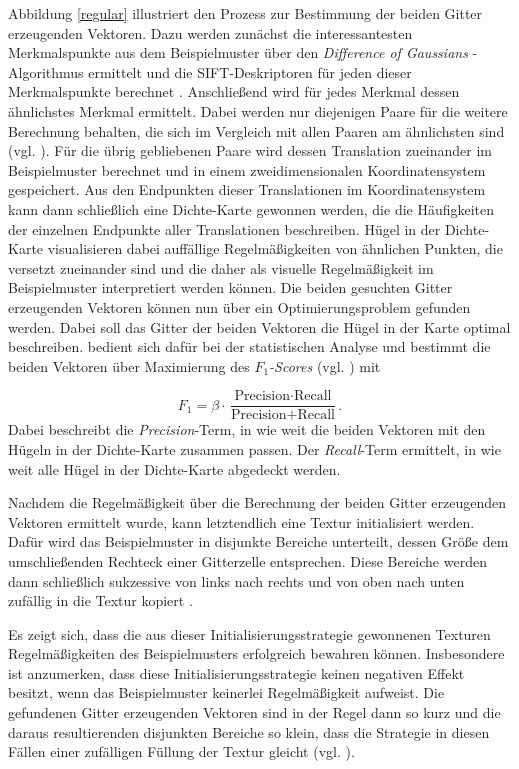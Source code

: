 Abbildung \ref{regular} illustriert den Prozess zur Bestimmung der beiden Gitter erzeugenden Vektoren.
Dazu werden zunächst die interessantesten Merkmalspunkte aus dem Beispielmuster über den \emph{\glqq Difference of Gaussians\grqq} -Algorithmus ermittelt und die SIFT-Deskriptoren für jeden dieser Merkmalspunkte berechnet \cite{SelfTuning}.
Anschließend wird für jedes Merkmal dessen ähnlichstes Merkmal ermittelt.
Dabei werden nur diejenigen Paare für die weitere Berechnung behalten, die sich im Vergleich mit allen Paaren am ähnlichsten sind (vgl. \cite{SelfTuning}).
Für die übrig gebliebenen Paare wird dessen Translation zueinander im Beispielmuster berechnet und in einem zweidimensionalen Koordinatensystem gespeichert.
Aus den Endpunkten dieser Translationen im Koordinatensystem kann dann schließlich eine Dichte-Karte gewonnen werden, die die Häufigkeiten der einzelnen Endpunkte aller Translationen beschreiben.
Hügel in der Dichte-Karte visualisieren dabei auffällige Regelmäßigkeiten von ähnlichen Punkten, die versetzt zueinander sind und die daher als visuelle Regelmäßigkeit im Beispielmuster interpretiert werden können.
Die beiden gesuchten Gitter erzeugenden Vektoren können nun über ein Optimierungsproblem gefunden werden.
Dabei soll das Gitter der beiden Vektoren die Hügel in der Karte optimal beschreiben.
\cite{SelfTuning} bedient sich dafür bei der statistischen Analyse und bestimmt die beiden Vektoren über Maximierung des \emph{\glqq $F_1$-Scores\grqq} (vgl. \cite{F1Score, SelfTuning}) mit

\begin{equation*}
	F_1 = \beta \cdot \frac{\text{Precision} \cdot \text{Recall}}{\text{Precision} + \text{Recall}}\text{.}
\end{equation*}
Dabei beschreibt die \emph{Precision}-Term, in wie weit die beiden Vektoren mit den Hügeln in der Dichte-Karte zusammen passen.
Der \emph{Recall}-Term ermittelt, in wie weit alle Hügel in der Dichte-Karte abgedeckt werden.

Nachdem die Regelmäßigkeit über die Berechnung der beiden Gitter erzeugenden Vektoren ermittelt wurde, kann letztendlich eine Textur initialisiert werden.
Dafür wird das Beispielmuster in disjunkte Bereiche unterteilt, dessen Größe dem umschließenden Rechteck einer Gitterzelle entsprechen.
Diese Bereiche werden dann schließlich sukzessive von links nach rechts und von oben nach unten zufällig in die Textur kopiert \cite{SelfTuning}.

Es zeigt sich, dass die aus dieser Initialisierungsstrategie gewonnenen Texturen Regelmäßigkeiten des Beispielmusters erfolgreich bewahren können.
Insbesondere ist anzumerken, dass diese Initialisierungsstrategie keinen negativen Effekt besitzt, wenn das Beispielmuster keinerlei Regelmäßigkeit aufweist.
Die gefundenen Gitter erzeugenden Vektoren sind in der Regel dann so kurz und die daraus resultierenden disjunkten Bereiche so klein, dass die Strategie in diesen Fällen einer zufälligen Füllung der Textur gleicht (vgl. \cite{SelfTuning}).


